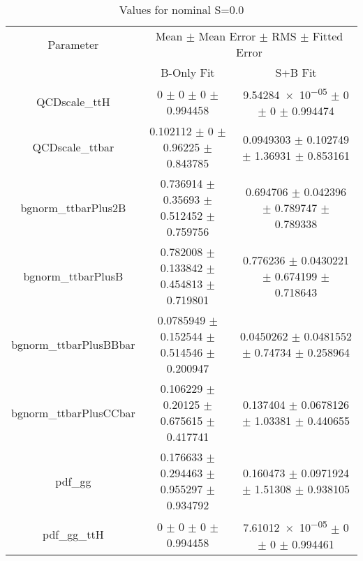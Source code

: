 \begin{table}
\centering
\caption{Values for nominal S=0.0}
\begin{tabular}{ccc}
\toprule
Parameter & \multicolumn{2}{c}{Mean $\pm$ Mean Error $\pm$ RMS $\pm$ Fitted Error}\\
 & B-Only Fit & S+B Fit\\
\midrule
QCDscale\_ttH & \num{0} $\pm$ \num{0} $\pm$ \num{0} $\pm$ \num{0.994458} & \num{9.54284e-05} $\pm$ \num{0} $\pm$ \num{0} $\pm$ \num{0.994474}\\
QCDscale\_ttbar & \num{0.102112} $\pm$ \num{0} $\pm$ \num{0.96225} $\pm$ \num{0.843785} & \num{0.0949303} $\pm$ \num{0.102749} $\pm$ \num{1.36931} $\pm$ \num{0.853161}\\
bgnorm\_ttbarPlus2B & \num{0.736914} $\pm$ \num{0.35693} $\pm$ \num{0.512452} $\pm$ \num{0.759756} & \num{0.694706} $\pm$ \num{0.042396} $\pm$ \num{0.789747} $\pm$ \num{0.789338}\\
bgnorm\_ttbarPlusB & \num{0.782008} $\pm$ \num{0.133842} $\pm$ \num{0.454813} $\pm$ \num{0.719801} & \num{0.776236} $\pm$ \num{0.0430221} $\pm$ \num{0.674199} $\pm$ \num{0.718643}\\
bgnorm\_ttbarPlusBBbar & \num{0.0785949} $\pm$ \num{0.152544} $\pm$ \num{0.514546} $\pm$ \num{0.200947} & \num{0.0450262} $\pm$ \num{0.0481552} $\pm$ \num{0.74734} $\pm$ \num{0.258964}\\
bgnorm\_ttbarPlusCCbar & \num{0.106229} $\pm$ \num{0.20125} $\pm$ \num{0.675615} $\pm$ \num{0.417741} & \num{0.137404} $\pm$ \num{0.0678126} $\pm$ \num{1.03381} $\pm$ \num{0.440655}\\
pdf\_gg & \num{0.176633} $\pm$ \num{0.294463} $\pm$ \num{0.955297} $\pm$ \num{0.934792} & \num{0.160473} $\pm$ \num{0.0971924} $\pm$ \num{1.51308} $\pm$ \num{0.938105}\\
pdf\_gg\_ttH & \num{0} $\pm$ \num{0} $\pm$ \num{0} $\pm$ \num{0.994458} & \num{7.61012e-05} $\pm$ \num{0} $\pm$ \num{0} $\pm$ \num{0.994461}\\
\bottomrule
\end{tabular}
\end{table}